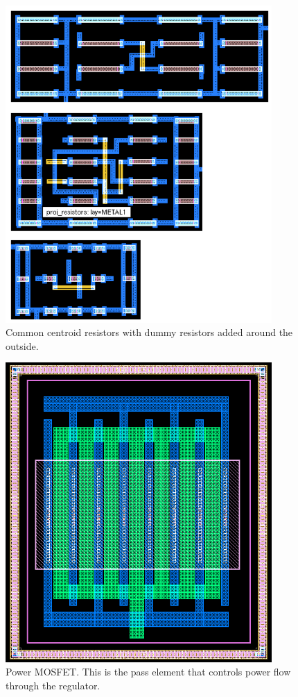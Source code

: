 \documentclass[10pt]{amsart}
\begin{document}
\begin{figure}[h]
	\begin{center}
		\includegraphics[width=4in, angle=90]{Media/res.png}
	\end{center}
	\caption{Common centroid resistors with dummy resistors added around the outside.}
	\label{fig:cc}
\end{figure}

\begin{figure}[H]
	\begin{center}
		\includegraphics[width=4in, angle=90]{Media/lay_mos.png}
	\end{center}
	\caption{Power MOSFET. This is the pass element that controls power flow through the regulator.}
	\label{fig:cc}
\end{figure}
\end{document}
